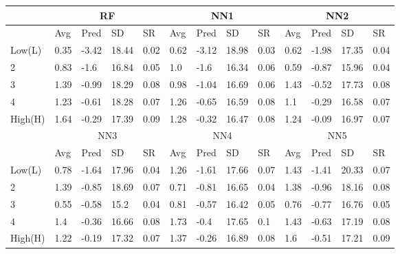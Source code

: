 \begin{tabularx}{\linewidth}{*{13}{X}}
 & \multicolumn{4}{c}{RF} & \multicolumn{4}{c}{NN1} & \multicolumn{4}{c}{NN2}\\
\hline
& Avg & Pred & SD & SR & Avg & Pred & SD & SR & Avg & Pred & SD & SR \\
\hline
Low(L)& 0.35& -3.42& 18.44& 0.02& 0.62& -3.12& 18.98& 0.03& 0.62& -1.98& 17.35& 0.04\\
2& 0.83& -1.6& 16.84& 0.05& 1.0& -1.6& 16.34& 0.06& 0.59& -0.87& 15.96& 0.04\\
3& 1.39& -0.99& 18.29& 0.08& 0.98& -1.04& 16.69& 0.06& 1.43& -0.52& 17.73& 0.08\\
4& 1.23& -0.61& 18.28& 0.07& 1.26& -0.65& 16.59& 0.08& 1.1& -0.29& 16.58& 0.07\\
High(H)& 1.64& -0.29& 17.39& 0.09& 1.28& -0.32& 16.47& 0.08& 1.24& -0.09& 16.97& 0.07\\
\hline
 & \multicolumn{4}{c}{NN3} & \multicolumn{4}{c}{NN4} & \multicolumn{4}{c}{NN5}\\
\hline
& Avg & Pred & SD & SR & Avg & Pred & SD & SR & Avg & Pred & SD & SR \\
\hline
Low(L)& 0.78& -1.64& 17.96& 0.04& 1.26& -1.61& 17.66& 0.07& 1.43& -1.41& 20.33& 0.07\\
2& 1.39& -0.85& 18.69& 0.07& 0.71& -0.81& 16.65& 0.04& 1.38& -0.96& 18.16& 0.08\\
3& 0.55& -0.58& 15.2& 0.04& 0.81& -0.57& 16.42& 0.05& 0.76& -0.77& 16.76& 0.05\\
4& 1.4& -0.36& 16.66& 0.08& 1.73& -0.4& 17.65& 0.1& 1.43& -0.63& 17.19& 0.08\\
High(H)& 1.22& -0.19& 17.32& 0.07& 1.37& -0.26& 16.89& 0.08& 1.6& -0.51& 17.21& 0.09\\
\hline
\end{tabularx}